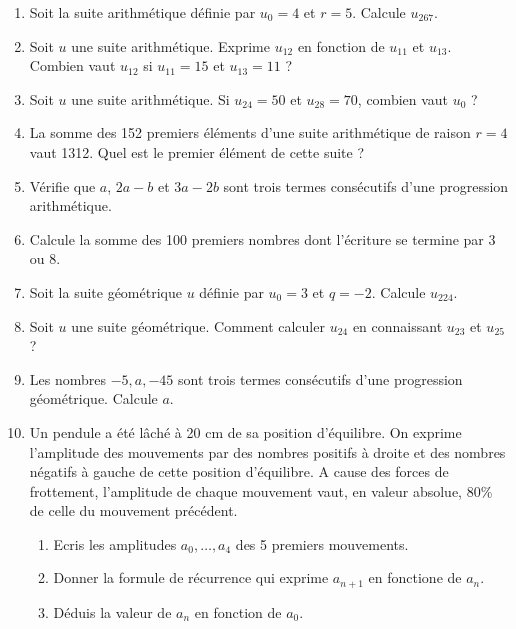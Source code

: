 \begin{enumerate}
		\item Soit la suite arithmétique définie par $u_0 = 4$ et $r = 5$. Calcule $u_{267}$.
		
		\item Soit $u$ une suite arithmétique. Exprime $u_{12}$ en fonction de $u_{11}$ et $u_{13}$. Combien vaut $u_{12}$ si $u_{11} = 15$ et $u_{13} = 11$ ?
		
		\item Soit $u$ une suite arithmétique. Si $u_{24} = 50$ et $u_{28} = 70$, combien vaut $u_0$ ?
		
		\item La somme des 152 premiers éléments d'une suite arithmétique de raison $r = 4$ vaut 1312. Quel est le premier élément de cette suite ?
		
		\item Vérifie que $a$, $2a - b$ et $3a - 2b$ sont trois termes consécutifs d'une progression arithmétique.
		
		\item Calcule la somme des 100 premiers nombres dont l'écriture se termine par 3 ou 8.
		
		\item Soit la suite géométrique $u$ définie par $u_0 = 3$ et $q = -2$. Calcule $u_{224}$.
		
		\item Soit $u$ une suite géométrique. Comment calculer $u_{24}$ en connaissant $u_{23}$ et $u_{25}$ ?
		
		\item Les nombres $-5, a, -45$ sont trois termes consécutifs d'une progression géométrique. Calcule $a$.
		
		\item Un pendule a été lâché à 20 cm de sa position d'équilibre. On exprime l'amplitude des mouvements par des nombres positifs à droite et des nombres négatifs à gauche de cette position d'équilibre. A cause des forces de frottement, l'amplitude de chaque mouvement vaut, en valeur absolue, 80\% de celle du mouvement précédent.
			\begin{enumerate}
				\item Ecris les amplitudes $a_0, \dots, a_4$ des 5 premiers mouvements.
				\item Donner la formule de récurrence qui exprime $a_{n+1}$ en fonctione de $a_n$.
				\item Déduis la valeur de $a_n$ en fonction de $a_0$.
			\end{enumerate}
	
	\end{enumerate}
	
